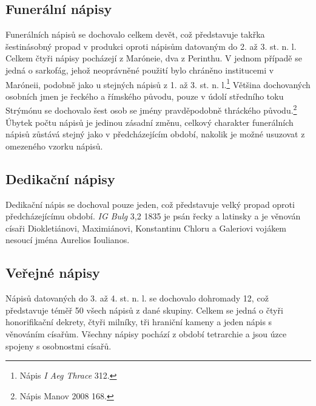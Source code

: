 \subsection[funerální-nápisy-16]{Funerální nápisy}

Funerálních nápisů se dochovalo celkem devět, což představuje takřka šestinásobný propad v produkci oproti nápisům datovaným do 2. až 3. st. n. l. Celkem čtyři nápisy pocházejí z Maróneie, dva z Perinthu. V jednom případě se jedná o sarkofág, jehož neoprávněné použití bylo chráněno institucemi v Maróneii, podobně jako u stejných nápisů z 1. až 3. st. n. l.\footnote{Nápis {\em I Aeg Thrace} 312.} Většina dochovaných osobních jmen je řeckého a římského původu, pouze v údolí středního toku Strýmónu se dochovalo šest osob se jmény pravděpodobně thráckého původu.\footnote{Nápis Manov 2008 168.} Úbytek počtu nápisů je jedinou zásadní změnu, celkový charakter funerálních nápisů zůstává stejný jako v předcházejícím období, nakolik je možné usuzovat z omezeného vzorku nápisů.

\subsection[dedikační-nápisy-16]{Dedikační nápisy}

Dedikační nápis se dochoval pouze jeden, což představuje velký propad oproti předcházejícímu období. {\em IG Bulg} 3,2 1835 je psán řecky a latinsky a je věnován císaři Diokletiánovi, Maximiánovi, Konstantinu Chloru a Galeriovi vojákem nesoucí jména Aurelios Ioulianos.

\subsection[veřejné-nápisy-16]{Veřejné nápisy}

Nápisů datovaných do 3. až 4. st. n. l. se dochovalo dohromady 12, což představuje téměř 50  všech nápisů z dané skupiny. Celkem se jedná o čtyři honorifikační dekrety, čtyři milníky, tři hraniční kameny a jeden nápis s věnováním císařům. Všechny nápisy pochází z období tetrarchie a jsou úzce spojeny s osobnostmi císařů.

